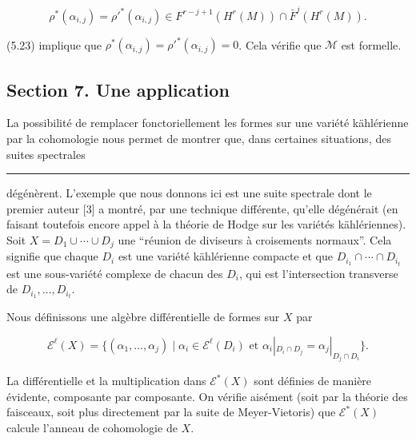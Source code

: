 \documentclass[
  french,
  a3paper,
  a3paper]{extarticle}
\begin{document}
\[\rho^*(\alpha_{i,j})=\rho'^*(\alpha_{i,j})\in F^{r-j+1}(H^r(M))\cap\bar F^j(H^r(M)).\]

(5.23) implique que \(\rho^*(\alpha_{i,j})=\rho'^*(\alpha_{i,j})=0\).
Cela vérifie que \(\mathcal{M}\) est formelle.

\subsection{Section 7. Une
application}\label{section-7.-une-application}

La possibilité de remplacer fonctoriellement les formes sur une variété
kählérienne par la cohomologie nous permet de montrer que, dans
certaines situations, des suites spectrales

\clearpage



\par

\vspace{0.7mm}\hrule\vspace{1.6mm}

\fontsize{9}{11}\selectfont

dégénèrent. L'exemple que nous donnons ici est une suite spectrale dont
le premier auteur {[}3{]} a montré, par une technique différente,
qu'elle dégénérait (en faisant toutefois encore appel à la théorie de
Hodge sur les variétés kählériennes). Soit \(X=D_1\cup\cdots\cup D_j\)
une ``réunion de diviseurs à croisements normaux''. Cela signifie que
chaque \(D_i\) est une variété kählérienne compacte et que
\(D_{i_1}\cap\cdots\cap D_{i_t}\) est une sous-variété complexe de
chacun des \(D_i\), qui est l'intersection transverse de
\(D_{i_1},\ldots,D_{i_t}\).

Nous définissons une algèbre différentielle de formes sur \(X\) par

\[\mathcal E^{\ell}(X)=\{(\alpha_1,\ldots,\alpha_j)\mid \alpha_i\in\mathcal E^{\ell}(D_i)\text{ et }\alpha_i|_{D_i\cap D_j}=\alpha_j|_{D_j\cap D_i}\}.\]

La différentielle et la multiplication dans \(\mathcal E^*(X)\) sont
définies de manière évidente, composante par composante. On vérifie
aisément (soit par la théorie des faisceaux, soit plus directement par
la suite de Meyer-Vietoris) que \(\mathcal E^*(X)\) calcule l'anneau de
cohomologie de \(X\).
\end{document}
